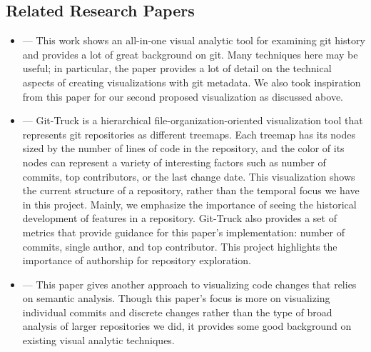 \documentclass[12 pt]{article}
\begin{document}
\subsection{Related Research Papers}
\begin{itemize}
\item \cite{githru} ---
    This work shows an all-in-one visual analytic tool for examining git history
        and provides a lot of great background on git. Many techniques here may
        be useful; in particular, the paper provides a lot of detail on the
        technical aspects of creating visualizations with git metadata. We
        also took inspiration from this paper for our second proposed
        visualization as discussed above.
\item \cite{gittruck} --- Git-Truck is a hierarchical file-organization-oriented
    visualization tool that represents git repositories as different treemaps.
    Each treemap has its nodes sized by the number of lines of code in the repository,
    and the color of its nodes can represent a variety of interesting factors
    such as number of commits, top contributors, or the last change date.
    This visualization shows the current structure of a repository, rather than the temporal
    focus we have in this project. Mainly, we emphasize the importance of seeing
    the historical development of features in a repository. Git-Truck also provides a
    set of metrics that provide guidance for this paper's implementation: number of commits,
    single author, and top contributor. This project highlights the importance of authorship for
    repository exploration.
\item \cite{changeprism} --- This paper gives another approach to visualizing
        code changes that relies on semantic analysis. Though this paper's focus
        is more on visualizing individual commits and discrete changes rather
        than the type of broad analysis of larger repositories we did,
        it provides some good background on existing visual analytic techniques.
\end{itemize}
\end{document}
